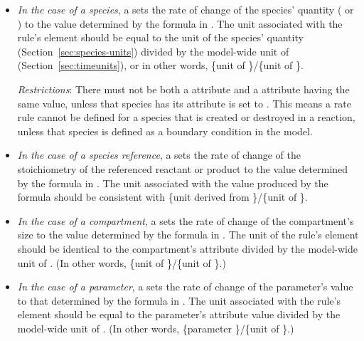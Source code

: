 \begin{itemize}
  
\item \emph{In the case of a species}, a \RateRule sets the rate
  of change of the species' quantity ( or
  ) to the value determined by the formula in
  .  The unit associated with the rule's 
  element should be equal to the unit of the species' quantity
  (Section~\ref{sec:species-units}) divided by the model-wide unit
  of  (Section~\ref{sec:timeunits}), or in other
  words, \{unit of \}/\{unit of
  \}.

  \emph{Restrictions}: There must not be both a \RateRule
   attribute and a \SpeciesReference {}
  attribute having the same value, unless that species has its
   attribute is set to .  This
  means a rate rule cannot be defined for a species that is
  created or destroyed in a reaction, unless that species is
  defined as a boundary condition in the model.

\item \emph{In the case of a species reference}, a \RateRule sets
  the rate of change of the stoichiometry of the referenced
  reactant or product to the value determined by the formula in
  .  The unit associated with the value produced by
  the formula should be consistent with \{unit derived from
  \}/\{unit of \}.
  
\item \emph{In the case of a compartment}, a \RateRule sets the
  rate of change of the compartment's size to the value determined
  by the formula in .  The unit of the rule's
   element should be identical to the compartment's
   attribute divided by the model-wide unit of
  .  (In other words, \{unit of
  \}/\{unit of \}.)

\item \emph{In the case of a parameter}, a \RateRule sets the rate
  of change of the parameter's value to that determined by the
  formula in .  The unit associated with the rule's
   element should be equal to the parameter's
   attribute value divided by the model-wide unit of
  .  (In other words, \{parameter
  \}/\{unit of \}.)


\end{itemize}
